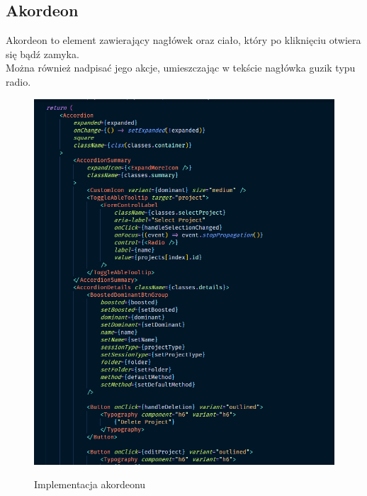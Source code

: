 \documentclass[a4paper,11pt]{report}
\begin{document}
\subsection{Akordeon}
\label{subsec:accordion}
Akordeon to element zawierający nagłówek oraz ciało, który po kliknięciu otwiera się bądź zamyka.\\
Można również nadpisać jego akcje, umieszczając w tekście nagłówka guzik typu radio.
\begin{figure}[H]
	\centering
	\includegraphics[scale=0.5]{implementacja/frontend/accordion}\\
	\caption{Implementacja akordeonu}
	\label{fig:accordion}
\end{figure}
\end{document}
